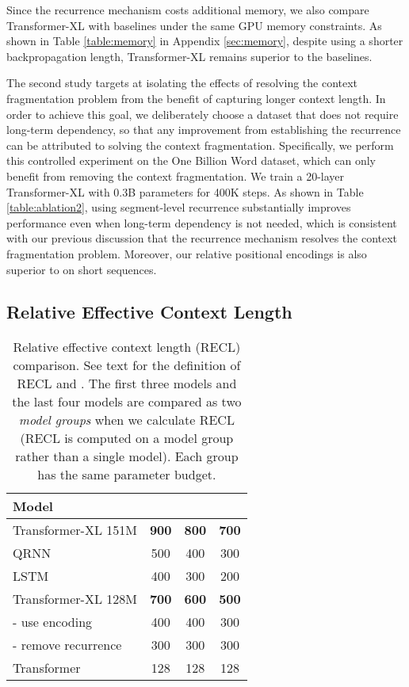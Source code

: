 \documentclass[11pt,a4paper]{article}
\begin{document}
Since the recurrence mechanism costs additional memory, we also compare Transformer-XL with baselines under the same GPU memory constraints. As shown in Table \ref{table:memory} in Appendix \ref{sec:memory}, despite using a shorter backpropagation length, Transformer-XL remains superior to the baselines.

The second study targets at isolating the effects of resolving the context fragmentation problem from the benefit of capturing longer context length.
In order to achieve this goal, we deliberately choose a dataset that does not require long-term dependency, so that any improvement from establishing the recurrence can be attributed to solving the context fragmentation.
Specifically, we perform this controlled experiment on the One Billion Word dataset, which can only benefit from removing the context fragmentation. We train a 20-layer Transformer-XL with 0.3B parameters for 400K steps.
As shown in Table \ref{table:ablation2}, using segment-level recurrence substantially improves performance even when long-term dependency is not needed, which is consistent with our previous discussion that the recurrence mechanism resolves the context fragmentation problem. Moreover, our relative positional encodings is also superior to \citet{shaw2018self} on short sequences.


\subsection{Relative Effective Context Length}
\bgroup
\setlength{\tabcolsep}{2pt}
\begin{table}[t]
	\small
	\centering
	\begin{tabular}{lccc}
		\toprule
		\bf Model &  &  &  \\
		\midrule
		Transformer-XL 151M & \textbf{900} & \textbf{800} & \textbf{700} \\
		QRNN & 500 & 400 & 300 \\
		LSTM & 400 & 300 & 200 \\
		\midrule
		Transformer-XL 128M & \textbf{700} & \textbf{600} & \textbf{500} \\
		- use \citet{shaw2018self} encoding & 400 & 400 & 300 \\
		- remove recurrence & 300 & 300 & 300 \\
		Transformer & 128 & 128 & 128 \\
		\bottomrule
	\end{tabular}
	\caption{\small
		Relative effective context length (RECL) comparison. See text for the definition of RECL and . The first three models and the last four models are
		compared as two \textit{model groups} when we calculate RECL (RECL is computed on a model group rather than a single model). Each group has the same parameter budget.
	}
	\label{table:recl}
\end{table}
\egroup
\end{document}
